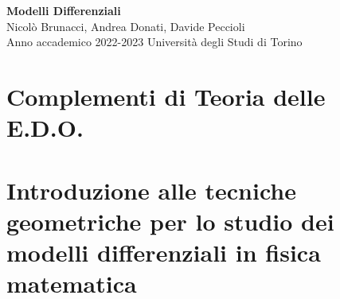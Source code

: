 \documentclass[11pt, titlepage, twoside, a4paper]{book}
\begin{document}
\frontmatter

\begin{titlepage}
\null
\vfill
\begin{center}
{\Huge \textbf{Modelli Differenziali}}\\
\vspace{1em}
{\large Nicolò Brunacci, Andrea Donati, Davide Peccioli}\\
\vspace{0.6em}
{\large Anno accademico 2022-2023}
\vfill
Università degli Studi di Torino
\end{center}
\end{titlepage}
{\pagestyle{empty}
\null\cleardoublepage}


\fancyhead{} %
\fancyfoot{}
\fancyfoot[C]{\thepage}
\renewcommand{\headrulewidth}{0.4pt}
\renewcommand{\footrulewidth}{0pt}
\pagestyle{fancy}

\tableofcontents\cleardoublepage


\mainmatter

\part{Complementi di Teoria delle E.D.O.}


\part{Introduzione alle tecniche geometriche per lo studio dei modelli differenziali in fisica matematica}





\backmatter


\cleardoublepage\normalem
\printbibliography
\end{document}
